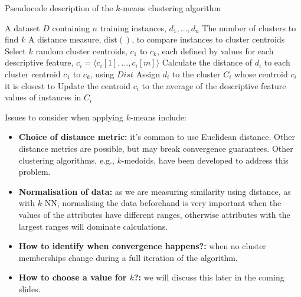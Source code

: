 \documentclass[a4paper,11pt]{article}
\begin{document}
\begin{algorithm}
\caption{Pseudocode description of the $k$-means clustering algorithm}
\begin{algorithmic}[1]
\Require A dataset $D$ containing $n$ training instances, $d_1, \dots, d_n$
\Require The number of clusters to find $k$
\Require A distance measure, $\text{dist}()$, to compare instances to cluster centroids
\State Select $k$ random cluster centroids, $c_1$ to $c_k$, each defined by values for each descriptive feature, $c_i = \langle c_i[1], \dots, c_i[m] \rangle$
\Repeat
        \State Calculate the distance of $d_i$ to each cluster centroid $c_1$ to $c_k$, using $Dist$
        \State Assign $d_i$ to the cluster $C_i$ whose centroid $c_i$ it is closest to
    \EndFor
        \State Update the centroid $c_i$ to the average of the descriptive feature values of instances in $C_i$
    \EndFor
{}
\end{algorithmic}
\end{algorithm}

Issues to consider when applying $k$-means include: 
\begin{itemize}
    \item   \textbf{Choice of distance metric:} it's common to use Euclidean distance.
            Other distance metrics are possible, but may break convergence guarantees.
            Other clustering algorithms, e.g., $k$-medoids, have been developed to address this problem.
    \item   \textbf{Normalisation of data:} as we are measuring similarity using distance, as with $k$-NN, normalising the data beforehand is very important when the values of the attributes have different ranges, otherwise attributes with the largest ranges will dominate calculations.
    \item   \textbf{How to identify when convergence happens?:} when no cluster memberships change during a full iteration of the algorithm.
    \item   \textbf{How to choose a value for $k$?:}  we will discuss this later in the coming slides.
\end{itemize}
\end{document}
